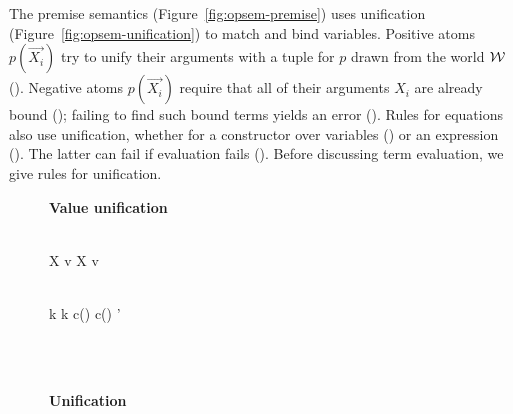 \documentclass[acmsmall,screen,nonacm]{acmart}
\newcommand{\hdr}[2]{%
\flushleft
\textbf{#1} \hfill {#2} \\
\centering
}
\theoremstyle{definition}
\begin{document}
The premise semantics (Figure~\ref{fig:opsem-premise}) uses unification (Figure~\ref{fig:opsem-unification}) to match and bind variables.
%
Positive atoms $p(\vec{X_i})$ try to unify their arguments with a
tuple for $p$ drawn from the world $\mathcal{W}$ ().
%
Negative atoms $p(\vec{X_i})$ require that all of their arguments
$X_i$ are already bound (); failing to find such bound
terms yields an error ().
%
Rules for equations also use unification, whether for a constructor
over variables () or an expression ().
%
The latter can fail if evaluation fails ().
%
Before discussing term evaluation, we give rules for unification.

\begin{figure}[t]
  \hdr{Value unification}{
    \quad \fbox{$\theta \vdash u \unify v \rhd \theta$}
    \quad \fbox{$\theta \vdash \vec{u} \unify \vec{v} \rhd \theta$}
  }

  ~ \\[0.5em]


  \sidebyside
  {
     {\theta \vdash X \unify v \rhd \theta}
  }
  {
     {\theta \vdash X \unify v \rhd \theta[X \mapsto v]}
  }

  ~ \\[0.5em]

  \sidebyside
  {\infrule[$uv$-Constant]
     {}
     {\theta \vdash k \unify k \rhd \theta}
  }
  {
     {\theta \vdash c() \unify c() \rhd \theta'}
  }

  ~ \\[0.5em]

  {
     {\theta \vdash {} \unify {} \rhd \theta}
  }

  ~ \\[0.5em]

  \hdr{Unification}{
    \quad \fbox{$\theta \vdash u \unify u : \theta_\bot$}
    \quad \fbox{$\theta \vdash \vec{u} \unify \vec{u} : \theta_\bot$}
  }

  ~ \\[0.5em]



\end{figure}
\end{document}
